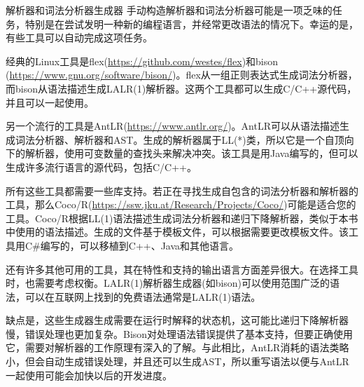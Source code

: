 \begin{myTip}{解析器和词法分析器生成器}
手动构造解析器和词法分析器可能是一项乏味的任务，特别是在尝试发明一种新的编程语言，并经常更改语法的情况下。幸运的是，有些工具可以自动完成这项任务。

经典的Linux工具是flex(\url{https://github.com/westes/flex})和bison (\url{https://www.gnu.org/software/bison/})。flex从一组正则表达式生成词法分析器，而bison从语法描述生成LALR(1)解析器。这两个工具都可以生成C/C++源代码，并且可以一起使用。

另一个流行的工具是AntLR(\url{https://www.antlr.org/})。AntLR可以从语法描述生成词法分析器、解析器和AST。生成的解析器属于LL(*)类，所以它是一个自顶向下的解析器，使用可变数量的查找头来解决冲突。该工具是用Java编写的，但可以生成许多流行语言的源代码，包括C/C++。

所有这些工具都需要一些库支持。若正在寻找生成自包含的词法分析器和解析器的工具，那么Coco/R(\url{https://ssw.jku.at/Research/Projects/Coco/})可能是适合您的工具。Coco/R根据LL(1)语法描述生成词法分析器和递归下降解析器，类似于本书中使用的语法描述。生成的文件基于模板文件，可以根据需要更改模板文件。该工具用C\#编写的，可以移植到C++、Java和其他语言。

还有许多其他可用的工具，其在特性和支持的输出语言方面差异很大。在选择工具时，也需要考虑权衡。LALR(1)解析器生成器(如bison)可以使用范围广泛的语法，可以在互联网上找到的免费语法通常是LALR(1)语法。

缺点是，这些生成器生成需要在运行时解释的状态机，这可能比递归下降解析器慢，错误处理也更加复杂。Bison对处理语法错误提供了基本支持，但要正确使用它，需要对解析器的工作原理有深入的了解。与此相比，AntLR消耗的语法类略小，但会自动生成错误处理，并且还可以生成AST，所以重写语法以便与AntLR一起使用可能会加快以后的开发进度。
\end{myTip}
















































